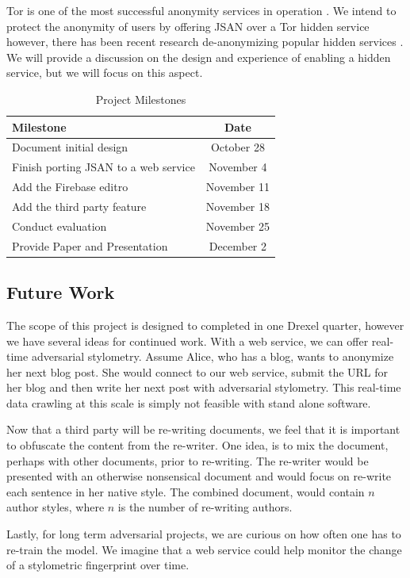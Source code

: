 \documentclass[letterpaper]{article}
\begin{document}
Tor is one of the most successful anonymity services in
operation \cite{Dingledine04tor:the}.  We intend to protect the
anonymity of users by offering JSAN over a Tor hidden service
however, there has been recent research de-anonymizing popular hidden
services \cite{oakland2013-trawling}.  We will provide a discussion on
the design and experience of enabling a hidden service, but we will
focus on this aspect.

\begin{table}
  \centering
  \begin{tabular}{l | c}
    Milestone & Date\\
    \hline

    Document initial design & October 28\\
    Finish porting JSAN to a web service & November 4\\
    Add the Firebase editro & November 11\\
    Add the third party feature & November 18\\
    Conduct evaluation & November 25\\
    Provide Paper and Presentation & December 2

  \end{tabular}
  \caption{Project Milestones}
  \label{tab:milestones}
\end{table}


\subsection*{Future Work}

The scope of this project is designed to completed in one Drexel
quarter, however we have several ideas for continued work.  With a web
service, we can offer real-time adversarial stylometry.  Assume Alice,
who has a blog, wants to anonymize her next blog post.  She would
connect to our web service, submit the URL for her blog and then write
her next post with adversarial stylometry.  This real-time data
crawling at this scale is simply not feasible with stand alone
software.

Now that a third party will be re-writing documents, we feel that it
is important to obfuscate the content from the re-writer.  One idea,
is to mix the document, perhaps with other documents, prior to
re-writing.  The re-writer would be presented with an otherwise
nonsensical document and would focus on re-write each sentence in her
native style.  The combined document, would contain $n$ author styles,
where $n$ is the number of re-writing authors.

Lastly, for long term adversarial projects, we are curious on how often
one has to re-train the model.  We imagine that a web service could
help monitor the change of a stylometric fingerprint over time.




\end{document}
